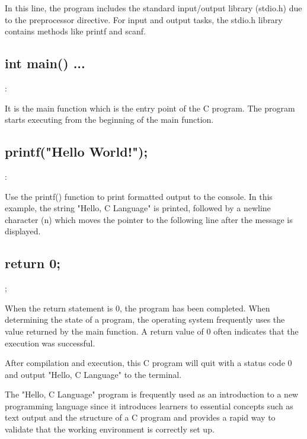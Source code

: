 In this line, the program includes the standard input/output library (stdio.h) due to the preprocessor directive. For input and output tasks, the stdio.h library contains methods like printf and scanf.

\subsection{int main() { ... }}:

It is the main function which is the entry point of the C program. The program starts executing from the beginning of the main function.

\subsection{printf("Hello World!");}:

Use the printf() function to print formatted output to the console. In this example, the string "Hello, C Language" is printed, followed by a newline character (n) which moves the pointer to the following line after the message is displayed.

\subsection{return 0;};

When the return statement is 0, the program has been completed. When determining the state of a program, the operating system frequently uses the value returned by the main function. A return value of 0 often indicates that the execution was successful.

After compilation and execution, this C program will quit with a status code 0 and output "Hello, C Language" to the terminal.

The "Hello, C Language" program is frequently used as an introduction to a new programming language since it introduces learners to essential concepts such as text output and the structure of a C program and provides a rapid way to validate that the working environment is correctly set up.

